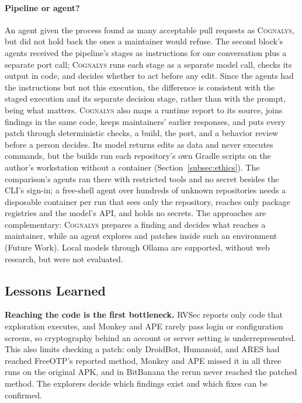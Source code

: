 \documentclass[conference]{IEEEtran}
\newcommand{\system}{\textsc{Cognalys}}
\begin{document}
\paragraph{Pipeline or agent?} An agent given the process found as many
acceptable pull requests as \system{}, but did not hold back the ones a
maintainer would refuse.
The second block's agents received the pipeline's stages as instructions for
one conversation plus a separate port call; \system{} runs each stage as a
separate model call, checks its output in code, and decides whether to act
before any edit. Since the agents had the
instructions but not this execution, the difference is consistent with the
staged execution and its separate decision stage, rather than with the prompt,
being what matters. \system{} also maps a runtime report to its source, joins
findings in the same code, keeps maintainers' earlier responses, and puts every
patch through deterministic checks, a build, the port, and a behavior review
before a person decides. Its model returns edits as data and never executes
commands, but the builds run each repository's own Gradle scripts on the
author's workstation without a container (Section~\ref{subsec:ethics}). The
comparison's agents ran there with restricted tools and no secret besides the
CLI's sign-in; a free-shell agent over hundreds of unknown repositories needs a
disposable container per run that sees only the repository, reaches only
package registries and the model's API, and holds no secrets. The approaches
are complementary: \system{} prepares a finding and decides what reaches a
maintainer, while an agent explores and patches inside such an environment
(Future Work). Local models through Ollama are supported, without web
research, but were not evaluated.

\subsection{Lessons Learned}
\label{sec:lessons}

\textbf{Reaching the code is the first bottleneck.} RVSec reports only code
that exploration executes, and Monkey and APE rarely pass login or
configuration screens, so cryptography behind an account or server setting is
underrepresented. This also limits checking a patch: only DroidBot, Humanoid,
and ARES had reached FreeOTP's reported method, Monkey and APE missed it in all
three runs on the original APK, and in BitBanana the rerun never reached the
patched method. The explorers decide which findings exist and which
fixes can be confirmed.
\end{document}
